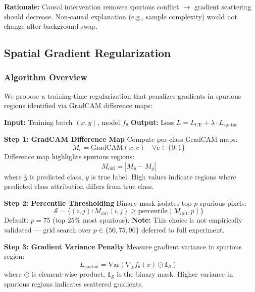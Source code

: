 \textbf{Rationale:} Causal intervention removes spurious conflict $\rightarrow$ gradient scattering should decrease. Non-causal explanation (e.g., sample complexity) would not change after background swap.

\subsection{Spatial Gradient Regularization}

\subsubsection{Algorithm Overview}

We propose a training-time regularization that penalizes gradients in spurious regions identified via GradCAM difference maps:

\textbf{Input:} Training batch $(x, y)$, model $f_\theta$
\textbf{Output:} Loss $L = L_{\text{CE}} + \lambda \cdot L_{\text{spatial}}$

\textbf{Step 1: GradCAM Difference Map}
Compute per-class GradCAM maps:
\begin{equation}
M_c = \text{GradCAM}(x, c) \quad \forall c \in \{0,1\}
\end{equation}
Difference map highlights spurious regions:
\begin{equation}
M_{\text{diff}} = |M_{\hat{y}} - M_{y}|
\end{equation}
where $\hat{y}$ is predicted class, $y$ is true label. High values indicate regions where predicted class attribution differs from true class.

\textbf{Step 2: Percentile Thresholding}
Binary mask isolates top-$p$ spurious pixels:
\begin{equation}
\mathcal{S} = \{(i,j) : M_{\text{diff}}(i,j) \geq \text{percentile}(M_{\text{diff}}, p)\}
\end{equation}
Default: $p = 75$ (top 25\% most spurious). \textbf{Note:} This choice is not empirically validated --- grid search over $p \in \{50, 75, 90\}$ deferred to full experiment.

\textbf{Step 3: Gradient Variance Penalty}
Measure gradient variance in spurious region:
\begin{equation}
L_{\text{spatial}} = \text{Var}\left(\nabla_x f_\theta(x) \odot \mathbb{1}_\mathcal{S}\right)
\end{equation}
where $\odot$ is element-wise product, $\mathbb{1}_\mathcal{S}$ is the binary mask. Higher variance in spurious regions indicates scattered gradients.

